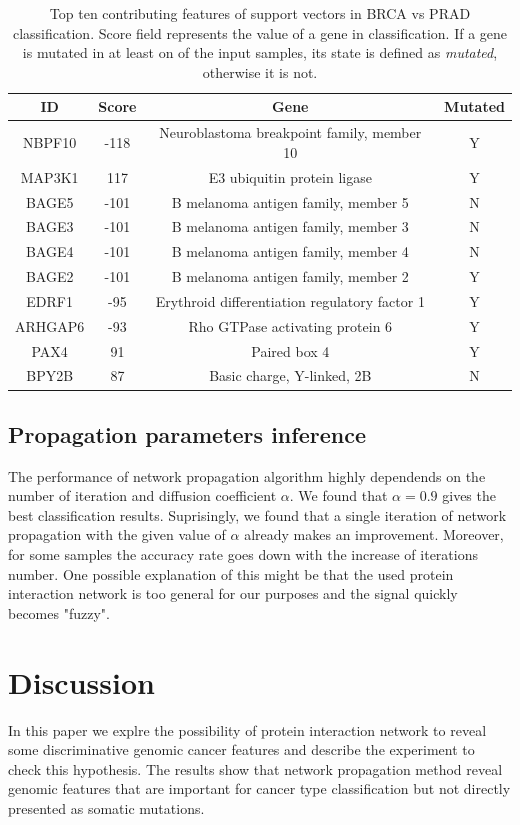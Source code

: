 \documentclass[a4paper]{article}
\begin{document}
\begin{table}[h]
	\small
    \begin{center}
    \begin{tabular}{c c c c}
	\hline
	ID & Score & Gene & Mutated \\
    \hline
	NBPF10 & -118 & Neuroblastoma breakpoint family, member 10 &  Y \\
	MAP3K1 & 117 & E3 ubiquitin protein ligase & Y \\
	BAGE5 & -101 & B melanoma antigen family, member 5 &  N \\
	BAGE3 & -101 & B melanoma antigen family, member 3 &  N \\
	BAGE4 & -101 & B melanoma antigen family, member 4 &  N \\
	BAGE2 & -101 & B melanoma antigen family, member 2 &  Y \\
	EDRF1 & -95 & Erythroid differentiation regulatory factor 1 &  Y \\
	ARHGAP6 & -93 & Rho GTPase activating protein 6 &  Y \\
	PAX4 & 91 & Paired box 4 &  Y \\
	BPY2B & 87 & Basic charge, Y-linked, 2B &  N \\
    \hline
    \end{tabular}
    \caption{Top ten contributing features of support vectors 
			 in BRCA vs PRAD classification. Score field represents
			 the value of a gene in classification. If a gene is mutated in at least
			 on of the input samples, its state is defined as \emph{mutated},
			 otherwise it is not.}
    \label{tab:features}
    \end{center}
\end{table}
\subsection{Propagation parameters inference}

The performance of network propagation algorithm highly dependends
on the number of iteration and diffusion coefficient $\alpha$. We found that $\alpha = 0.9$
gives the best classification results. Suprisingly, we found that a single iteration 
of network propagation with the given value of $\alpha$ already makes an improvement.
Moreover, for some samples the accuracy rate goes down with the increase of iterations number.
One possible explanation of this might be that the used protein interaction network 
is too general for our purposes and the signal quickly becomes "fuzzy".

\section{Discussion}

In this paper we explre the possibility of protein interaction network to reveal
some discriminative genomic cancer features and describe the experiment to check
this hypothesis. The results show that network propagation method reveal genomic features
that are important for cancer type classification but not directly presented as
somatic mutations.
\end{document}

